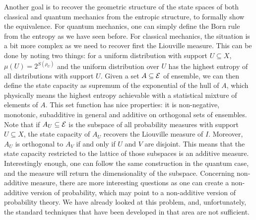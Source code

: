 Another goal is to recover the geometric structure of the state spaces of both classical and quantum mechanics from the entropic structure, to formally show the equivalence. For quantum mechanics, one can simply define the Born rule from the entropy as we have seen before. For classical mechanics, the situation is a bit more complex as we need to recover first the Liouville measure. This can be done by noting two things: for a uniform distribution with support $U \subseteq X$, $\mu(U) = 2^{S(\rho_U)}$ and the uniform distribution over $U$ has the highest entropy of all distributions with support $U$. Given a set $A \subseteq \mathcal{E}$ of ensemble, we can then define the state capacity as supremum of the exponential of the hull of $A$, which physically means the highest entropy achievable with a statistical mixture of elements of $A$. This set function has nice properties: it is non-negative, monotonic, subadditive in general and additive on orthogonal sets of ensembles. Note that if $A_U \subseteq \mathcal{E}$ is the subspace of all probability measures with support $U \subseteq X$, the state capacity of $A_U$ recovers the Liouville measure of $I$. Moreover, $A_U$ is orthogonal to $A_V$ if and only if $U$ and $V$ are disjoint. This means that the state capacity restricted to the lattice of those subspaces is an additive measure. Interestingly enough, one can follow the same construction in the quantum case, and the measure will return the dimensionality of the subspace. Concerning non-additive measure, there are more interesting questions as one can create a non-additive version of probability, which may point to a non-additive version of probability theory. We have already looked at this problem, and, unfortunately, the standard techniques that have been developed in that area are not sufficient.

